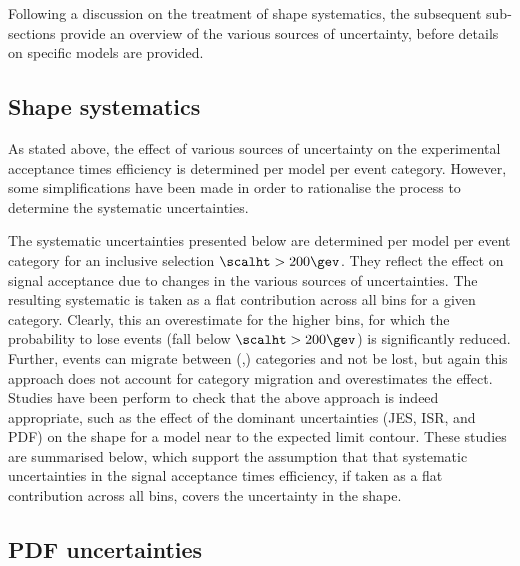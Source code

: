 
Following a discussion on the treatment of shape systematics, the
subsequent sub-sections provide an overview of the various sources of
uncertainty, before details on specific models are provided. 

\subsection{Shape systematics} 

As stated above, the effect of various sources of uncertainty on the
experimental acceptance times efficiency is determined per model per
event category. However, some simplifications have been made in order
to rationalise the process to determine the systematic uncertainties. 

The systematic uncertainties presented below are determined per model
per event category for an inclusive selection $\scalht >
200\gev$. They reflect the effect on signal acceptance due to changes
in the various sources of uncertainties. The resulting systematic is
taken as a flat contribution across all \scalht bins for a given
category. Clearly, this an overestimate for the higher \scalht bins,
for which the probability to lose events (\ie fall below $\scalht >
200\gev$) is significantly reduced. Further, events can migrate
between (\njet,\nb) categories and not be lost, but again this
approach does not account for category migration and overestimates the
effect. Studies have been perform to check that the above approach is
indeed appropriate, such as the effect of the dominant uncertainties
(\eg JES, ISR, and PDF) on the \scalht shape for a model near to the
expected limit contour. These studies are summarised below, which
support the assumption that that systematic uncertainties in the
signal acceptance times efficiency, if taken as a flat contribution
across all \scalht bins, covers the uncertainty in the \scalht shape.

\subsection{PDF uncertainties\label{sec:pdf-sets}}

\newcommand{\lcr}{Left: $\frac{\epsilon_{CTEQ6L1}}{\epsilon_{CT10}}$,
  center: $\frac{\epsilon_{CTEQ6L1}}{\epsilon_{MSTW08}}$, right:
  $\frac{\epsilon_{CTEQ6L1}}{\epsilon_{NNPDF2.1}}$}

